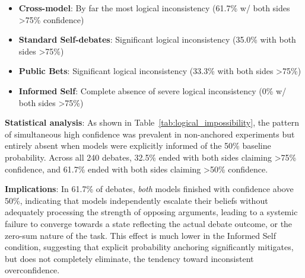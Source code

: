 \documentclass{article}
\begin{document}
\begin{itemize}
    \item \textbf{Cross-model}: By far the most logical inconsistency (61.7\% w/ both sides >75\% confidence)
    \item \textbf{Standard Self-debates}: Significant logical inconsistency (35.0\% with both sides >75\%)
    \item \textbf{Public Bets}: Significant logical inconsistency (33.3\% with both sides >75\%)
    \item \textbf{Informed Self}: Complete absence of severe logical inconsistency (0\% w/ both sides >75\%)
\end{itemize}

\textbf{Statistical analysis}: As shown in Table~\ref{tab:logical_impossibility}, the pattern of simultaneous high confidence was prevalent in non-anchored experiments but entirely absent when models were explicitly informed of the 50\% baseline probability. Across all 240 debates, 32.5\% ended with both sides claiming >75\% confidence, and 61.7\% ended with both sides claiming >50\% confidence.

\textbf{Implications}: In 61.7\% of debates, \emph{both} models finished with confidence above 50\%, indicating that models independently escalate their beliefs without adequately processing the strength of opposing arguments, leading to a systemic failure to converge towards a state reflecting the actual debate outcome, or the zero-sum nature of the task. This effect is much lower in the Informed Self condition, suggesting that explicit probability anchoring significantly mitigates, but does not completely eliminate, the tendency toward inconsistent overconfidence.
\end{document}
